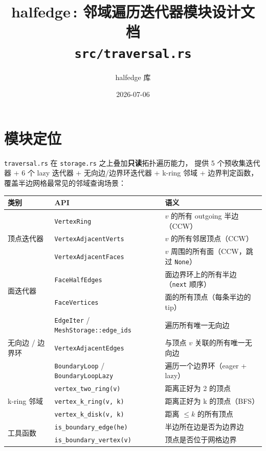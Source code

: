 \documentclass[11pt,a4paper]{article}
\title{\textbf{halfedge\,: 邻域遍历迭代器模块设计文档} \\ \large \texttt{src/traversal.rs}}
\author{halfedge 库}
\date{2026-07-06}
\begin{document}
\maketitle
\tableofcontents

\section{模块定位}

\texttt{traversal.rs} 在 \texttt{storage.rs} 之上叠加\textbf{只读}拓扑遍历能力，
提供 5 个预收集迭代器 + 6 个 lazy 迭代器 + 无向边/边界环迭代器 + k-ring 邻域 + 边界判定函数，
覆盖半边网格最常见的邻域查询场景：

\begin{center}
\scriptsize
\renewcommand{\arraystretch}{1.18}
\begin{tabular}{@{}lll@{}}
  \toprule
  \textbf{类别} & \textbf{API} & \textbf{语义} \\
  \midrule
  \multirow{3}{*}{顶点迭代器}
    & \texttt{VertexRing}          & $v$ 的所有 outgoing 半边（CCW） \\
    & \texttt{VertexAdjacentVerts} & $v$ 的所有邻居顶点（CCW） \\
    & \texttt{VertexAdjacentFaces} & $v$ 周围的所有面（CCW，跳过 \texttt{None}） \\
  \midrule
  \multirow{2}{*}{面迭代器}
    & \texttt{FaceHalfEdges} & 面边界环上的所有半边（\texttt{next} 顺序） \\
    & \texttt{FaceVertices}  & 面的所有顶点（每条半边的 tip） \\
  \midrule
  \multirow{3}{*}{无向边 / 边界环}
    & \texttt{EdgeIter} / \texttt{MeshStorage::edge\_ids} & 遍历所有唯一无向边 \\
    & \texttt{VertexAdjacentEdges}                        & 与顶点 $v$ 关联的所有唯一无向边 \\
    & \texttt{BoundaryLoop} / \texttt{BoundaryLoopLazy}   & 遍历一个边界环（eager + lazy） \\
  \midrule
  \multirow{3}{*}{k-ring 邻域}
    & \texttt{vertex\_two\_ring(v)} & 距离正好为 2 的顶点 \\
    & \texttt{vertex\_k\_ring(v, k)} & 距离正好为 k 的顶点（BFS） \\
    & \texttt{vertex\_k\_disk(v, k)} & 距离 $\le k$ 的所有顶点 \\
  \midrule
  \multirow{4}{*}{工具函数}
    & \texttt{is\_boundary\_edge(he)}   & 半边所在边是否为边界边 \\
    & \texttt{is\_boundary\_vertex(v)}  & 顶点是否位于网格边界 \\

\end{tabular}
\end{center}
\end{document}
